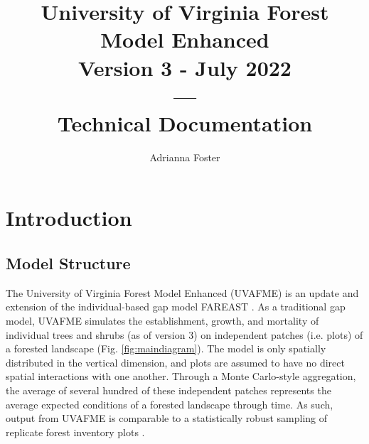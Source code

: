 \documentclass[a4paper, 12pt] {report}
\begin{document}
     \title{%
University of Virginia Forest Model Enhanced \\
\large Version 3 - July 2022\\
---\\
\large Technical Documentation 
}
\author{Adrianna Foster}
     \maketitle

\tableofcontents

\chapter{Introduction} \label{chap:intro}
\section{Model Structure}
The University of Virginia Forest Model Enhanced (UVAFME) is an update and extension of the individual-based gap model FAREAST \cite{yanFAREASTForestGap2005}. As a traditional gap model, UVAFME simulates the establishment, growth, and mortality of individual trees and shrubs (as of version 3) on independent patches (i.e. plots) of a forested landscape (Fig. \ref{fig:maindiagram}). The model is only spatially distributed in the vertical dimension, and plots are assumed to have no direct spatial interactions with one another. Through a Monte Carlo-style aggregation, the average of several hundred of these independent patches represents the average expected conditions of a forested landscape through time. As such, output from UVAFME is comparable to a statistically robust sampling of replicate forest inventory plots \cite{shugartGlobalChangeTerrestrial2011, shugartGapModelsTheir2018}.
\end{document}
